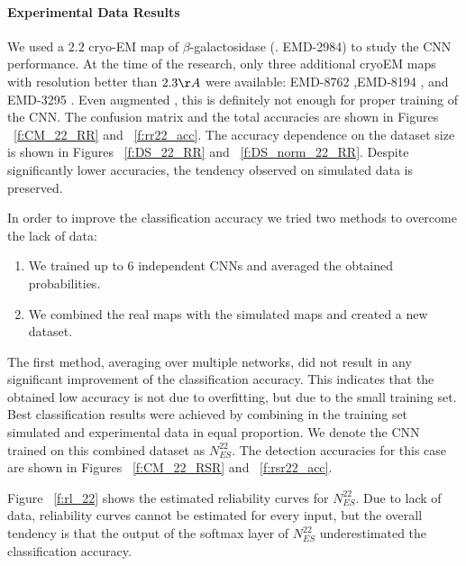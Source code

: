 \paragraph{Experimental Data Results}
We used a $2.2$ cryo-EM map of $\beta$-galactosidase (\cite{Bartesaghi20152.2Inhibitor}. EMD-2984) to study the CNN performance.
At the time of the research, only three additional cryoEM maps with resolution better than $2.3 \AA$ were available: EMD-8762 \cite{Dong2017Antibody-inducedB14},EMD-8194 \cite{Merk2016BreakingDiscovery}, and EMD-3295 \cite{Banerjee20162.3Inhibition}.
Even augmented , this is definitely not enough for proper training of the CNN.
The confusion matrix and the total accuracies are shown in Figures ~\ref{f:CM_22_RR} and ~\ref{f:rr22_acc}.
The accuracy dependence on the dataset size is shown in Figures ~\ref{f:DS_22_RR} and ~\ref{f:DS_norm_22_RR}.
Despite significantly lower accuracies, the tendency observed on simulated data is preserved.

In order to improve the classification accuracy we tried two methods to overcome the lack of data:
\begin{enumerate}
\item We trained up to 6 independent CNNs and averaged the obtained probabilities.
\item We combined the real maps with the simulated maps and created  a new dataset.
\end{enumerate}
The first method, averaging over multiple networks, did not result in any significant improvement of the classification accuracy.
This indicates that the obtained low accuracy is not due to overfitting, but due to the small training set.
Best classification results were achieved by combining in the training set simulated and experimental data in equal proportion.
We denote the CNN trained on this combined dataset as $N^{22}_{ES}$.
The detection accuracies for this case are shown in Figures ~\ref{f:CM_22_RSR} and ~\ref{f:rsr22_acc}.

Figure ~\ref{f:rl_22} shows the estimated reliability curves for $N^{22}_{ES}$. 
Due to lack of data, reliability curves cannot be estimated for every input, but the overall tendency is that the output of the softmax layer of $N^{22}_{ES}$ underestimated the classification accuracy.

